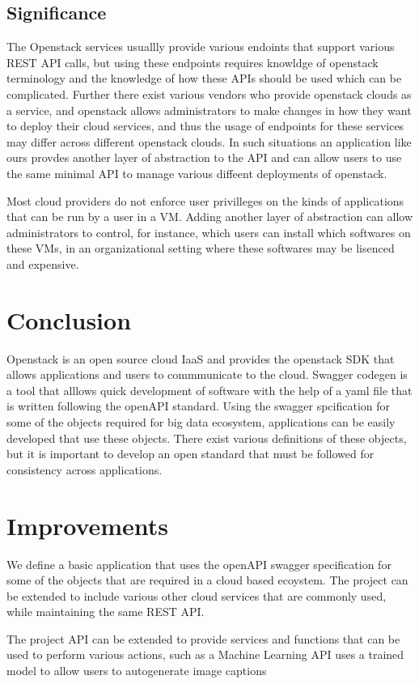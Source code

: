 \subsection{Significance}
The Openstack services usuallly provide various endoints that support
various REST API calls, but using these endpoints requires knowldge of
openstack terminology and the knowledge of how these APIs should be
used which can be complicated. Further there exist various vendors who
provide openstack clouds as a service, and openstack allows
administrators to make changes in how they want to deploy their cloud
services, and thus the usage of endpoints for these services may
differ across different openstack clouds. In such situations an
application like ours provdes another layer of abstraction to the API
and can allow users to use the same minimal API to manage various
diffeent deployments of openstack.

Most cloud providers do not enforce user privilleges on the
kinds of applications that can be run by a user in a VM. Adding
another layer of abstraction can allow administrators to control, for
instance, which users can install which softwares on these VMs, in an
organizational setting where these softwares may be lisenced and
expensive.

\section{Conclusion}
Openstack is an open source cloud IaaS and provides the openstack SDK
that allows applications and users to commmunicate to the
cloud. Swagger codegen is a tool that alllows quick development of
software with the help of a yaml file that is written following the
openAPI standard. Using the swagger spcification for some of the
objects required for big data ecosystem, applications can be easily
developed that use these objects. There exist various definitions of
these objects, but it is important to develop an open standard that
must be followed for consistency across applications.

\section{Improvements}
We define a basic application that uses the openAPI swagger specification
for some of the objects that are required in a cloud based
ecoystem. The project can be extended to include various other cloud services
that are commonly used, while maintaining the same REST API.

The project API can be extended to provide services and functions that
can be used to perform various actions, such as a Machine Learning API uses a
trained model to allow users to autogenerate image captions
\cite{hid-sp18-503-image-cap}

 
